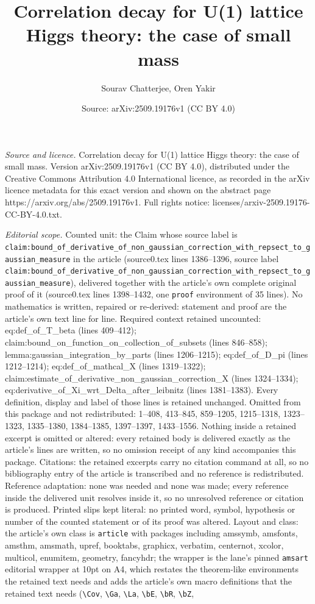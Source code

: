 \documentclass[10pt,a4paper]{amsart}
\title[Correlation decay for U(1) lattice Higgs theory: the case of]{Correlation decay for U(1) lattice Higgs theory: the case of small mass}
\author{Sourav Chatterjee, Oren Yakir}
\date{Source: arXiv:2509.19176v1 (CC BY 4.0)}
\begin{document}
\maketitle

\noindent\emph{Source and licence.} Correlation decay for U(1) lattice Higgs theory: the case of small mass. Version arXiv:2509.19176v1 (CC BY 4.0), distributed under the Creative Commons Attribution 4.0 International licence, as recorded in the arXiv licence metadata for this exact version and shown on the abstract page https://arxiv.org/abs/2509.19176v1. Full rights notice: licenses/arxiv-2509.19176-CC-BY-4.0.txt.\par\smallskip

\noindent\textit{Editorial scope.} Counted unit: the Claim whose source label is \texttt{claim:bound\_of\_derivative\_of\_non\_gaussian\_correction\_with\_repsect\_to\_gaussian\_measure} in the article (source0.tex lines 1386--1396, source label \texttt{claim:bound\_of\_derivative\_of\_non\_gaussian\_correction\_with\_repsect\_to\_gaussian\_measure}), delivered together with the article's own complete original proof of it (source0.tex lines 1398--1432, one \texttt{proof} environment of 35 lines). No mathematics is written, repaired or re-derived: statement and proof are the article's own text line for line. Required context retained uncounted: eq:def\_of\_T\_beta (lines 409--412); claim:bound\_on\_function\_on\_collection\_of\_subsets (lines 846--858); lemma:gaussian\_integration\_by\_parts (lines 1206--1215); eq:def\_of\_D\_pi (lines 1212--1214); eq:def\_of\_mathcal\_X (lines 1319--1322); claim:estimate\_of\_derivative\_non\_gaussian\_correction\_X (lines 1324--1334); eq:derivative\_of\_Xi\_wrt\_Delta\_after\_leibnitz (lines 1381--1383). Every definition, display and label of those lines is retained unchanged. Omitted from this package and not redistributed: 1--408, 413--845, 859--1205, 1215--1318, 1323--1323, 1335--1380, 1384--1385, 1397--1397, 1433--1556. Nothing inside a retained excerpt is omitted or altered: every retained body is delivered exactly as the article's lines are written, so no omission receipt of any kind accompanies this package. Citations: the retained excerpts carry no citation command at all, so no bibliography entry of the article is transcribed and no reference is redistributed. Reference adaptation: none was needed and none was made; every reference inside the delivered unit resolves inside it, so no unresolved reference or citation is produced. Printed slips kept literal: no printed word, symbol, hypothesis or number of the counted statement or of its proof was altered. Layout and class: the article's own class is \texttt{article} with packages including amssymb, amsfonts, amsthm, amsmath, upref, booktabs, graphicx, verbatim, centernot, xcolor, multicol, enumitem, geometry, fancyhdr; the wrapper is the lane's pinned \texttt{amsart} editorial wrapper at 10pt on A4, which restates the theorem-like environments the retained text needs and adds the article's own macro definitions that the retained text needs (\texttt{\textbackslash Cov}, \texttt{\textbackslash Ga}, \texttt{\textbackslash La}, \texttt{\textbackslash bE}, \texttt{\textbackslash bR}, \texttt{\textbackslash bZ}, 
\end{document}

